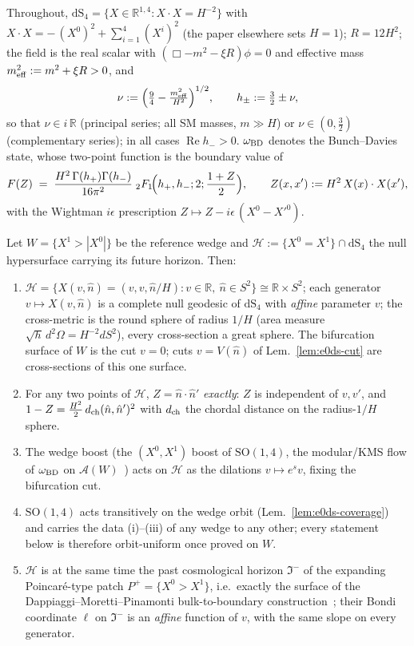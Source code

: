 Throughout, $\mathrm{dS}_4=\{X\in\mathbb R^{1,4}:X\cdot
X=H^{-2}\}$ with $X\cdot X=-\,(X^0)^2+\sum_{i=1}^4(X^i)^2$ (the paper
elsewhere sets $H=1$); $R=12H^2$; the field is the real scalar with
$(\Box-m^2-\xi R)\phi=0$ and effective mass
$m_{\rm eff}^2:=m^2+\xi R>0$, and
\[
\nu:=\Bigl(\tfrac94-\tfrac{m_{\rm eff}^2}{H^2}\Bigr)^{1/2},
\qquad
h_\pm:=\tfrac32\pm\nu ,
\]
so that $\nu\in i\,\mathbb R$ (principal series; all SM masses,
$m\gg H$) or $\nu\in(0,\tfrac32)$ (complementary series); in all
cases $\operatorname{Re}h_->0$. $\omega_{\rm BD}$ denotes the
Bunch--Davies state, whose two-point function is the boundary value
of
\begin{equation}
\label{eq:ds2-bd}
F(Z)\;=\;\frac{H^{2}\,\Gamma(h_+)\Gamma(h_-)}{16\pi^{2}}\;
{}_2F_1\!\Bigl(h_+,h_-;2;\frac{1+Z}{2}\Bigr),
\qquad Z(x,x'):=H^{2}\,X(x)\cdot X(x'),
\end{equation}
with the Wightman $i\epsilon$ prescription
$Z\mapsto Z-i\epsilon\,(X^{0}-X'^{0})$.

\begin{lemma}
\label{lem:ds2-geom}
Let $W=\{X^1>|X^0|\}$ be the reference wedge and
$\mathcal H:=\{X^0=X^1\}\cap\mathrm{dS}_4$ the null hypersurface
carrying its future horizon. Then:
\begin{enumerate}
\item[(i)] $\mathcal H=\{X(v,\hat n)=(v,v,\hat n/H):v\in\mathbb
  R,\ \hat n\in S^2\}\cong\mathbb R\times S^2$; each generator
  $v\mapsto X(v,\hat n)$ is a complete null geodesic of
  $\mathrm{dS}_4$ with \emph{affine} parameter $v$; the cross-metric
  is the round sphere of radius $1/H$ (area measure $\sqrt h\,
  d^2\Omega=H^{-2}dS^2$), every cross-section a great sphere. The
  bifurcation surface of $W$ is the cut $v=0$; cuts $v=V(\hat n)$ of
  Lem.~\ref{lem:e0ds-cut} are cross-sections of this one surface.
\item[(ii)] For any two points of $\mathcal H$,
  $Z=\hat n\cdot\hat n'$ \emph{exactly}: $Z$ is independent of
  $v,v'$, and $1-Z=\tfrac{H^{2}}{2}\,d_{\rm ch}(\hat n,\hat n')^{2}$
  with $d_{\rm ch}$ the chordal distance on the radius-$1/H$ sphere.
\item[(iii)] The wedge boost (the $(X^0,X^1)$ boost of
  $\mathrm{SO}(1,4)$, the modular/KMS flow of $\omega_{\rm BD}$ on
  $\mathcal A(W)$~\cite{BorchersBuchholz1999}) acts on $\mathcal H$
  as the dilations $v\mapsto e^{s}v$, fixing the bifurcation cut.
\item[(iv)] $\mathrm{SO}(1,4)$ acts transitively on the wedge orbit
  (Lem.~\ref{lem:e0ds-coverage}) and carries the data
  (i)--(iii) of any wedge to any other; every statement below is
  therefore orbit-uniform once proved on $W$.
\item[(v)] $\mathcal H$ is at the same time the past cosmological
  horizon $\Im^-$ of the expanding Poincar\'e-type patch
  $P^+=\{X^0>X^1\}$, i.e.\ exactly the surface of the
  Dappiaggi--Moretti--Pinamonti bulk-to-boundary
  construction~\cite{DappiaggiMorettiPinamonti2009}; their Bondi
  coordinate $\ell$ on $\Im^-$ is an \emph{affine} function of $v$,
  with the same slope on every generator.
\end{enumerate}
\end{lemma}

